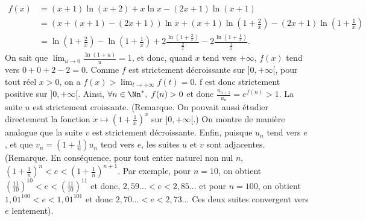 {{\begin{align*}
f(x)&=(x+1)\ln(x+2)+x\ln x-(2x+1)\ln(x+1)\\
 &=(x+(x+1)-(2x+1))\ln x+(x+1)\ln\left(1+\frac{2}{x}\right)-(2x+1)\ln\left(1+\frac{1}{x}\right)\\
 &=\ln\left(1+\frac{2}{x}\right)-\ln\left(1+\frac{1}{x}\right)+2\frac{\ln\left(1+\frac{2}{x}\right)}{\frac{2}{x}}-2\frac{\ln\left(1+\frac{1}{x}\right)}{\frac{1}{x}}.
\end{align*}
On sait que $\lim_{u\rightarrow 0}\frac{\ln(1+u)}{u}=1$, et donc, quand $x$ tend vers $+\infty$, $f(x)$ tend vers $0+0+2-2=0$. Comme $f$ est strictement décroissante sur $]0,+\infty[$, pour tout réel $x>0$, on a $f(x)>\lim_{t\rightarrow +\infty}f(t)=0$.
f est donc strictement positive sur $]0,+\infty[$. Ainsi, $\forall n\in\Nn^*,\;f(n)>0$ et donc $\frac{u_{n+1}}{u_n}=e^{f(n)}>1$. La suite $u$ est strictement croissante.
(Remarque. On pouvait aussi étudier directement la fonction $x\mapsto\left(1+\frac{1}{x}\right)^x$ sur $]0,+\infty[$.)
On montre de manière analogue que la suite $v$ est strictement décroissante. Enfin, puisque $u_n$ tend vers $e$, et que $v_n=\left(1+\frac{1}{n}\right)u_n$ tend vers $e$, les suites $u$ et $v$ sont adjacentes.
(Remarque. En conséquence, pour tout entier naturel non nul $n$, $\left(1+\frac{1}{n}\right)^n<e<\left(1+\frac{1}{n}\right)^{n+1}$. Par exemple, pour $n=10$, on obtient $\left(\frac{11}{10}\right)^{10}<e<\left(\frac{11}{10}\right)^{11}$ et donc, $2,59...<e<2,85...$ et pour $n=100$, on obtient $1,01^{100}<e<1,01^{101}$ et donc $2,70...<e<2,73...$ Ces deux suites convergent vers $e$ lentement).}
}